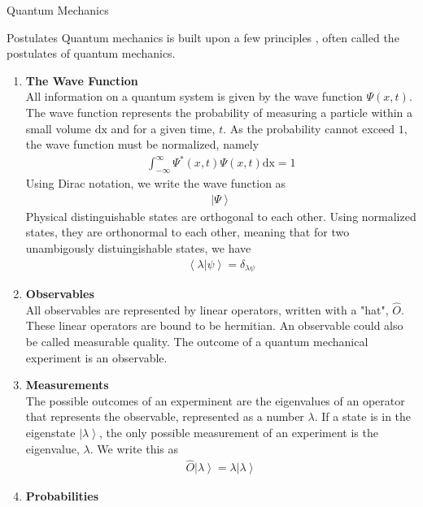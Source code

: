 \documentclass[twoside,english]{uiofysmaster}
\begin{document}
\begin{chapter}{Quantum Mechanics}
 	
	\begin{section}{Postulates}
 		Quantum mechanics is built upon a few principles \cite{Audun,Griffiths,Sakurai,Susskind2014}, often called the postulates of quantum mechanics. 
 		\begin{enumerate}
 			\item \textbf{The Wave Function} \\
 			All information on a quantum system is given by the wave function $\Psi(x,t) $. The wave function represents the probability of measuring a particle within a small volume $\text{dx}$ and for a given time, $t$. As the probability cannot exceed $1$, the wave function must be normalized, namely
 			\begin{align}
 				\int_{-\infty}^\infty \Psi^*(x,t) \Psi(x,t) \text{dx} = 1
 			\end{align}
 			Using Dirac notation, we write the wave function as
 			\begin{align}
 				\left| \Psi \right>
 			\end{align}
 			Physical distinguishable states are orthogonal to each other. Using normalized states, they are orthonormal to each other, meaning that for two unambigously distuingishable states, we have
 			\begin{align}
 				\left< \lambda | \psi \right> = \delta_{\lambda \psi}
 			\end{align}
 			\item \textbf{Observables}\\
			All observables are represented by linear operators, written with a "hat", $\hat O$. These linear operators are bound to be hermitian. An observable could also be called measurable quality. The outcome of a quantum mechanical experiment is an observable. 
			\item \textbf{Measurements}\\
			The possible outcomes of an experminent are the eigenvalues of an operator that represents the observable, represented as a number $\lambda$. If a state is in the eigenstate $\left| \lambda \right>$, the only possible measurement of an experiment is the eigenvalue, $\lambda$. We write this as
 			\begin{align}
 				\hat O \left| \lambda \right> = \lambda \left| \lambda \right>
 			\end{align}
 			\item \textbf{Probabilities}\\

\end{enumerate}
\end{section}
\end{chapter}
\end{document}
